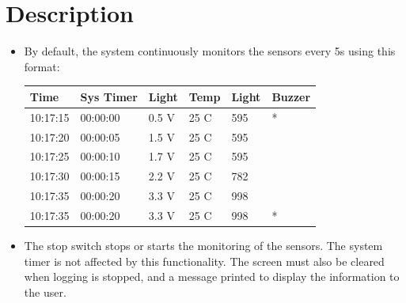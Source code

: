 \section{Description}
\label{sec:ProjDescription}
\begin{itemize}
    \item By default, the system continuously monitors the sensors every 5s using this format:
    \begin{table}[H]
    \centering
    \begin{tabular}{|l|l|l|l|l|l|}
    \hline
    Time     & Sys Timer & Light  & Temp & Light &  Buzzer  \\ \hline
    10:17:15 & 00:00:00  & 0.5 V  & 25 C & 595   & *        \\ \hline
    10:17:20 & 00:00:05  & 1.5 V  & 25 C & 595   &          \\ \hline
    10:17:25 & 00:00:10  & 1.7 V  & 25 C & 595   &          \\ \hline
    10:17:30 & 00:00:15  & 2.2 V  & 25 C & 782   &          \\ \hline
    10:17:35 & 00:00:20  & 3.3 V  & 25 C & 998   &          \\ \hline
    10:17:35 & 00:00:20  & 3.3 V  & 25 C & 998   & *        \\ \hline
    \end{tabular}
    \end{table}
    \item The stop switch stops or starts the monitoring of the sensors. The system timer is not affected by this functionality. The screen must also be cleared when logging is stopped, and a message printed to display the information to the user.
 
\end{itemize}

